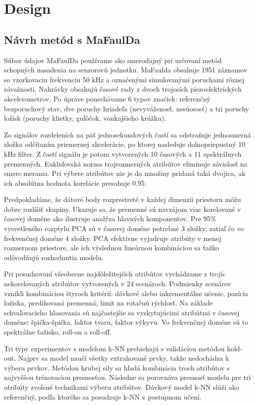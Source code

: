 \chapter{Design} \label{chapter:design}


\section{Návrh metód s MaFaulDa}
Súbor údajov MaFaulDa používame ako smerodajný pri určovaní metód schopných nasadenia na senzorovú jednotku. MaFaulda obsahuje 1951 záznamov so vzorkovaciu frekvenciu 50 kHz a označenými simulovanými poruchami rôznej závažnosti. Nahrávky obsahujú časové rady z dvoch trojosích piezoelektrických akcelerometrov. Po úprave ponechávame 6 typov značiek: referenčný bezporuchový stav, dve poruchy hriadeľa (nevyváženosť, nesúososť) a tri poruchy ložísk (poruchy klietky, guľôčok, vonkajšieho krúžku). 

Zo signálov rozdeleních na päť jednosekundových častí sa odstraňuje jednosmerná zložka odčítaním priemernej akcelerácie, po ktorej nasleduje dolnopriepustný 10 kHz filter. Z častí signálu je potom vytvorených 10 časových a 11 spektrálnych premenných. Euklidovská norma trojrozmerných atribútov eliminuje závislosť na smere merania. Pri výbere atribútov nie je do množiny pridaná taká dvojica, ak ich absolútna hodnota korelácie presahuje 0.95.

Predpokladáme, že dátové body rozprestreté v každej dimenzii priestoru môžu dobre rozlíšiť skupiny. Ukazuje sa, že premenné sú navzájom viac korelované v časovej doméne ako ilustruje analýza hlavných komponentov. Pre 95\% vysvetleného rozptylu PCA sú v časovej doméne potrebné 3 zložky, zatiaľ čo vo frekvenčnej doméne 4 zložky. PCA efektívne vyjadruje atribúty v menej rozmernom priestore, ale ich výslednou lineárnou kombináciou sa ťažko odôvodňujú rozhodnutia modelu.

Pri posudzovaní všeobecne najdôležitejších atribútov vychádzame z trojíc nekorelovaných atribútov vytvorených v 24 scenároch. Podmienky scenárov vznikli kombináciou štyroch kritérií: dávkové alebo inkrementálne učenie, pozícia ložiska, predikovaná premenná, limit na rotačnú rýchlosť. Na základe schvaľovacieho hlasovania sú najčastejšie sa vyskytujúcimi atribútmi v časovej doméne: špička-špička, faktor tvaru, faktor výkyvu. Vo frekvenčnej doméne sú to spektrálne ťažisko, roll-on a roll-off.

Tri typy experimentov s modelom k-NN prebiehajú s validáciou metódou hold-out, Najprv sa model naučí všetky extrahované prvky, takže nedochádza k výberu prvkov. Metódou hrubej sily sa hľadá kombinácia troch atribútov s najvyššou trénovaciou presnosťou. Následne sa porovnáva presnosť modelu pre tri atribúty zvolené technikami výberu atribútov. Dávkový model k-NN slúži ako referenčný, podľa ktorého sa posudzuje k-NN v postupnom učení.


